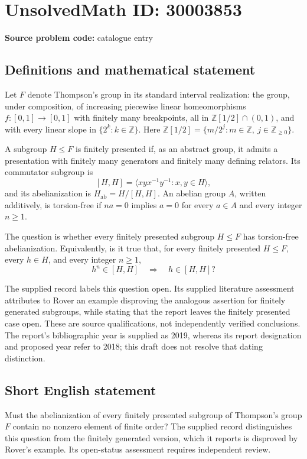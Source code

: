 \documentclass[11pt]{article}
\newcommand{\Z}{\mathbb{Z}}
\begin{document}
\section*{UnsolvedMath ID: 30003853}
\textbf{Source problem code:} catalogue entry
\subsection{Definitions and mathematical statement}
Let \(F\) denote Thompson's group in its standard interval realization: the group, under composition, of increasing piecewise linear homeomorphisms \(f:[0,1]\to[0,1]\) with finitely many breakpoints, all in \(\Z[1/2]\cap(0,1)\), and with every linear slope in \(\{2^k:k\in\Z\}\). Here \(\Z[1/2]=\{m/2^j:m\in\Z,\ j\in\Z_{\geq0}\}\).

A subgroup \(H\leq F\) is finitely presented if, as an abstract group, it admits a presentation with finitely many generators and finitely many defining relators. Its commutator subgroup is
\[
[H,H]=\langle xyx^{-1}y^{-1}:x,y\in H\rangle,
\]
and its abelianization is \(H_{\mathrm{ab}}=H/[H,H]\). An abelian group \(A\), written additively, is torsion-free if \(na=0\) implies \(a=0\) for every \(a\in A\) and every integer \(n\geq1\).

The question is whether every finitely presented subgroup \(H\leq F\) has torsion-free abelianization. Equivalently, is it true that, for every finitely presented \(H\leq F\), every \(h\in H\), and every integer \(n\geq1\),
\[
h^n\in[H,H]\quad\Longrightarrow\quad h\in[H,H]?
\]

The supplied record labels this question open. Its supplied literature assessment attributes to Rover an example disproving the analogous assertion for finitely generated subgroups, while stating that the report leaves the finitely presented case open. These are source qualifications, not independently verified conclusions. The report's bibliographic year is supplied as 2019, whereas its report designation and proposed year refer to 2018; this draft does not resolve that dating distinction.
\subsection{Short English statement}
Must the abelianization of every finitely presented subgroup of Thompson's group \(F\) contain no nonzero element of finite order? The supplied record distinguishes this question from the finitely generated version, which it reports is disproved by Rover's example. Its open-status assessment requires independent review.
\end{document}

